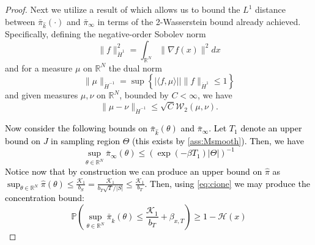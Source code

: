 \documentclass[journal,onecolumn]{IEEEtran}
\newcommand{\grad}{\nabla}
\newcommand{\rew}{J}
\newcommand{\reals}{\mathbb{R}}
\newcommand{\PR}{\mathbb{P}}
\newcommand{\dimn}{N}
\newcommand{\wass}{\mathcal{W}_2}
\newcommand{\mk}{\mathcal{K}}
\newcommand{\kfv}{x} %
\newcommand{\hk}{\hat{k}}
\begin{document}
{{\begin{proof}

Next we utilize a result of \cite{peyre2018comparison} which allows us to bound the $L^1$ distance between $\bar{\pi}_{\hk}(\cdot)$
and $\bar{\pi}_{\infty}$ in terms of the 2-Wasserstein bound already achieved. Specifically, defining the negative-order Sobolev norm
\[\|f\|^2_{\dot{H}^1} = \int_{\reals^{\dimn}}\|\grad f(x)\|^2 dx\] and for a measure $\mu$ on $\reals^{\dimn}$ the dual norm
\[\|\mu\|_{\dot{H}^{-1}} = \sup\left\{|\langle f,\mu\rangle| \bigg|\|f\|_{\dot{H}^1} \leq 1\right\}\] and given measures $\mu,\nu$ on $\reals^{\dimn}$, bounded by $C < \infty$, we have 
\begin{equation*}
    \|\mu - \nu\|_{\dot{H}^{-1}} \leq \sqrt{C}\wass(\mu,\nu).
\end{equation*}

\textcolor{black}{Now consider the following bounds on $\bar{\pi}_{\hk}(\theta)$ and $\bar{\pi}_{\infty}$. Let $T_1$ denote an upper bound on $\rew$ in sampling region $\Theta$ (this exists by \ref{ass:Msmooth}). Then, we have \begin{equation}
    \sup_{\theta\in\reals^{\dimn}}\bar{\pi}_{\infty}(\theta) \leq (\exp(-\beta T_1)|\Theta|)^{-1}
\end{equation}
Notice now that by construction we can produce an upper bound on $\hat{\pi}$ as $\sup_{\theta \in \reals^{\dimn}}\hat{\pi}(\theta) \leq \frac{\mk_1}{b_S} = \frac{\mk_1}{b_T \sqrt{T}/|S|} \leq \frac{\mk_1}{b_T}$. Then, using \eqref{eq:cione} we may produce the concentration bound:
\begin{equation}
\PR\left(\sup_{\theta\in\reals^{\dimn}}\bar{\pi}_{\hk} (\theta) \leq \frac{\mk_1}{b_T} + \beta_{x,T}\right) \geq 1-\mathcal{H}(x)
\end{equation}}


\end{proof}}}
\end{document}
